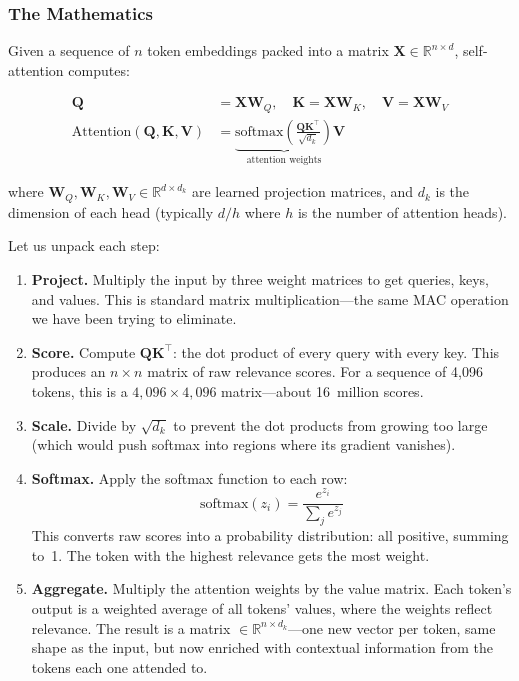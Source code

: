\subsubsection{The Mathematics}

Given a sequence of $n$ token embeddings packed into a matrix
$\bm{X} \in \mathbb{R}^{n \times d}$, self-attention computes:

\begin{align}
  \bm{Q} &= \bm{X}\bm{W}_Q, \quad
  \bm{K} = \bm{X}\bm{W}_K, \quad
  \bm{V} = \bm{X}\bm{W}_V
  \label{eq:qkv}\\[6pt]
  \text{Attention}(\bm{Q}, \bm{K}, \bm{V})
  &= \underbrace{\text{softmax}\!\left(
    \frac{\bm{Q}\bm{K}^\top}{\sqrt{d_k}}
  \right)}_{\text{attention weights}}
  \bm{V}
  \label{eq:attention}
\end{align}

where $\bm{W}_Q, \bm{W}_K, \bm{W}_V \in \mathbb{R}^{d \times d_k}$
are learned projection matrices, and $d_k$ is the dimension of each
head (typically $d / h$ where $h$ is the number of attention heads).

Let us unpack each step:

\begin{enumerate}[leftmargin=2em]
  \item \textbf{Project.} Multiply the input by three weight matrices
    to get queries, keys, and values. This is standard matrix
    multiplication---the same MAC operation we have been trying to
    eliminate.

  \item \textbf{Score.} Compute $\bm{Q}\bm{K}^\top$: the dot product
    of every query with every key. This produces an $n \times n$
    matrix of raw relevance scores. For a sequence of 4{,}096 tokens,
    this is a $4{,}096 \times 4{,}096$ matrix---about 16~million
    scores.

  \item \textbf{Scale.} Divide by $\sqrt{d_k}$ to prevent the dot
    products from growing too large (which would push softmax into
    regions where its gradient vanishes).

  \item \textbf{Softmax.} Apply the softmax function to each row:
    \begin{equation}
      \text{softmax}(z_i) = \frac{e^{z_i}}{\sum_j e^{z_j}}
      \label{eq:softmax}
    \end{equation}
    This converts raw scores into a probability distribution: all
    positive, summing to~1. The token with the highest relevance
    gets the most weight.

  \item \textbf{Aggregate.} Multiply the attention weights by the
    value matrix. Each token's output is a weighted average of all
    tokens' values, where the weights reflect relevance. The result
    is a matrix $\in \mathbb{R}^{n \times d_k}$---one new vector per
    token, same shape as the input, but now enriched with contextual
    information from the tokens each one attended to.
\end{enumerate}

